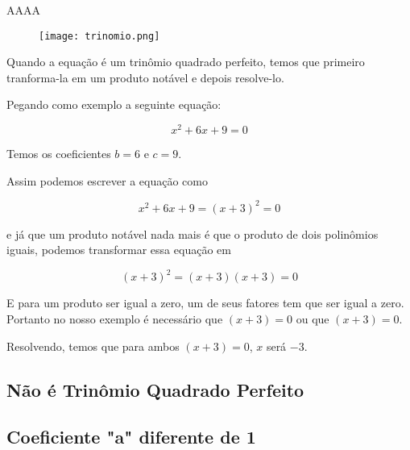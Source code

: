 \documentclass[../resumo.tex]{subfiles}
\begin{document}
	AAAA

	\begin{figure}[h]
		\centering
		\texttt{[image: trinomio.png]}
	\end{figure}



	Quando a equação é um trinômio quadrado perfeito, temos que primeiro tranforma-la em um produto notável
	e depois resolve-lo.

	Pegando como exemplo a seguinte equação:

	\[ x^2 + 6x + 9 = 0 \]

	Temos os coeficientes $b = 6$ e $c = 9$.

	Assim podemos escrever a equação como

	\[ x^2 + 6x + 9 = (x + 3)^2 = 0 \]

	e já que um produto notável nada mais é que o produto de dois polinômios iguais, podemos transformar 
	essa equação em

	\[ (x + 3)^2 = (x + 3)(x + 3) = 0 \]

	E para um produto ser igual a zero, um de seus fatores tem que ser igual a zero. Portanto no nosso exemplo
	é necessário que $(x + 3) = 0$ ou que $(x + 3) = 0$.

	Resolvendo, temos que para ambos $(x + 3) = 0$, $x$ será $-3$. 

	\subsection{Não é Trinômio Quadrado Perfeito}

	\subsection{Coeficiente "a" diferente de 1}
\end{document}
